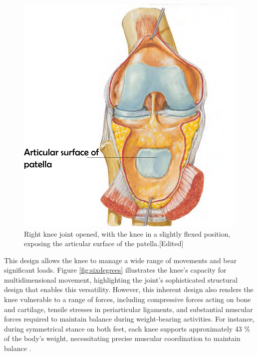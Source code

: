 \documentclass{micro-econ-thesis}
\begin{document}
\begin{figure} [H]
	\centering
	\includegraphics[scale=0.3]{patellar_surface}
	\caption{Right knee joint opened, with the knee in a slightly flexed position, exposing the articular surface of the patella.[Edited] \parencite[p.517]{netter_519_2023}}
	\label{fig:patellarsurface}
\end{figure}

This design allows the knee to manage a wide range of movements and bear significant loads. Figure \ref{fig:sixdegrees} illustrates the knee's capacity for multidimensional movement, highlighting the joint's sophisticated structural design that enables this versatility. However, this inherent design also renders the knee vulnerable to a range of forces, including compressive forces acting on bone and cartilage, tensile stresses in periarticular ligaments, and substantial muscular forces required to maintain balance during weight-bearing activities. \parencite{standring_grays_2021} For instance, during symmetrical stance on both feet, each knee supports approximately 43 \% of the body's weight, necessitating precise muscular coordination to maintain balance \parencite{maquet2012biomechanics}.
\end{document}
